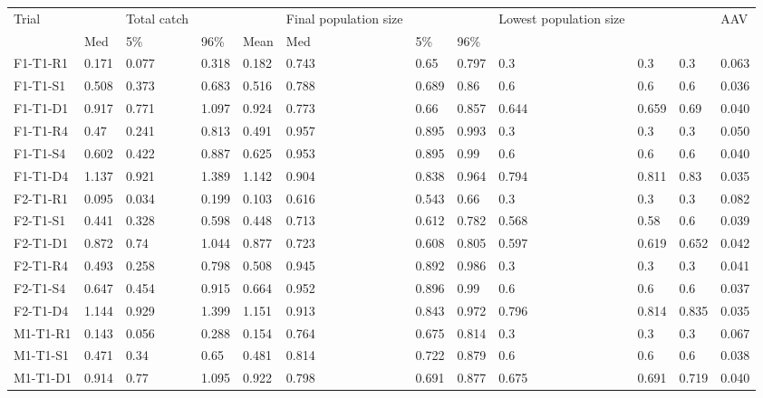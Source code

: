 \begin{table}[ht]
\centering
\begin{tabular}{llllllllllll}
  \hline
  \hline
Trial &  & Total catch &  &  & Final population size &  &  & Lowest population size &  &  & AAV \\ 
   & Med & 5\% & 96\% & Mean & Med & 5\% & 96\% &  &  &  &  \\ 
  F1-T1-R1 & 0.171 & 0.077 & 0.318 & 0.182 & 0.743 & 0.65 & 0.797 & 0.3 & 0.3 & 0.3 &    0.063  \\ 
  F1-T1-S1 & 0.508 & 0.373 & 0.683 & 0.516 & 0.788 & 0.689 & 0.86 & 0.6 & 0.6 & 0.6 &    0.036  \\ 
  F1-T1-D1 & 0.917 & 0.771 & 1.097 & 0.924 & 0.773 & 0.66 & 0.857 & 0.644 & 0.659 & 0.69 &    0.040  \\ 
  F1-T1-R4 & 0.47 & 0.241 & 0.813 & 0.491 & 0.957 & 0.895 & 0.993 & 0.3 & 0.3 & 0.3 &    0.050  \\ 
  F1-T1-S4 & 0.602 & 0.422 & 0.887 & 0.625 & 0.953 & 0.895 & 0.99 & 0.6 & 0.6 & 0.6 &    0.040  \\ 
  F1-T1-D4 & 1.137 & 0.921 & 1.389 & 1.142 & 0.904 & 0.838 & 0.964 & 0.794 & 0.811 & 0.83 &    0.035  \\ 
  F2-T1-R1 & 0.095 & 0.034 & 0.199 & 0.103 & 0.616 & 0.543 & 0.66 & 0.3 & 0.3 & 0.3 &    0.082  \\ 
  F2-T1-S1 & 0.441 & 0.328 & 0.598 & 0.448 & 0.713 & 0.612 & 0.782 & 0.568 & 0.58 & 0.6 &    0.039  \\ 
  F2-T1-D1 & 0.872 & 0.74 & 1.044 & 0.877 & 0.723 & 0.608 & 0.805 & 0.597 & 0.619 & 0.652 &    0.042  \\ 
  F2-T1-R4 & 0.493 & 0.258 & 0.798 & 0.508 & 0.945 & 0.892 & 0.986 & 0.3 & 0.3 & 0.3 &    0.041  \\ 
  F2-T1-S4 & 0.647 & 0.454 & 0.915 & 0.664 & 0.952 & 0.896 & 0.99 & 0.6 & 0.6 & 0.6 &    0.037  \\ 
  F2-T1-D4 & 1.144 & 0.929 & 1.399 & 1.151 & 0.913 & 0.843 & 0.972 & 0.796 & 0.814 & 0.835 &    0.035  \\ 
  M1-T1-R1 & 0.143 & 0.056 & 0.288 & 0.154 & 0.764 & 0.675 & 0.814 & 0.3 & 0.3 & 0.3 &    0.067  \\ 
  M1-T1-S1 & 0.471 & 0.34 & 0.65 & 0.481 & 0.814 & 0.722 & 0.879 & 0.6 & 0.6 & 0.6 &    0.038  \\ 
  M1-T1-D1 & 0.914 & 0.77 & 1.095 & 0.922 & 0.798 & 0.691 & 0.877 & 0.675 & 0.691 & 0.719 &    0.040  \\ 

\end{tabular}
\end{table}
